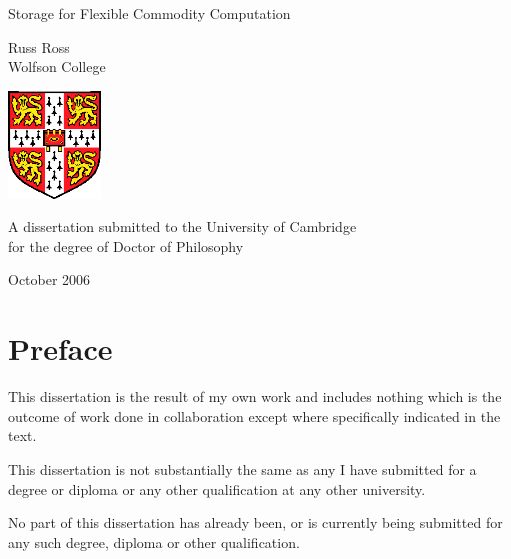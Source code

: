 
\pagestyle{empty}
\begin{titlepage}
\begin{center}
\vspace*{\fill}

\huge
Storage for Flexible Commodity Computation

\vfill
\vfill

\huge
Russ Ross\\[6mm]
\large
Wolfson College

\vfill
\includegraphics[width=70pt]{eps/camshield}
\vfill

\large
A dissertation submitted to the University of Cambridge\\
for the degree of Doctor of Philosophy

\vfill

October 2006

\vspace*{\fill}
\end{center}
\end{titlepage}
\cleardoublepage



\chapter*{Preface}

\vspace*{\fill}

\noindent This dissertation is the result of my own work and
includes nothing which is the outcome of work done in collaboration
except where specifically indicated in the text.

\noindent This dissertation is not substantially the same as any I
have submitted for a degree or diploma or any other qualification at
any other university.

\noindent No part of this dissertation has already been, or is
currently being submitted for any such degree, diploma or other
qualification.

